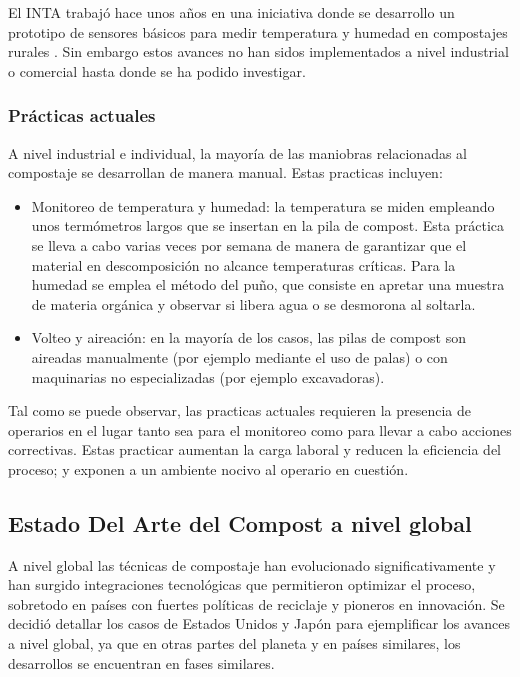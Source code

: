 El INTA trabajó hace unos años en una iniciativa donde se desarrollo un prototipo de sensores básicos para medir temperatura y humedad en compostajes rurales \citep{INTASensorCompost}. Sin embargo estos avances no han sidos implementados a nivel industrial o comercial hasta donde se ha podido investigar.

\subsubsection{Prácticas actuales}
A nivel industrial e individual, la mayoría de las maniobras relacionadas al compostaje se desarrollan de manera manual. Estas practicas incluyen:
\begin{itemize}
    \item Monitoreo de temperatura y humedad: la temperatura se miden empleando unos termómetros largos que se insertan en la pila de compost. Esta práctica se lleva a cabo varias veces por semana de manera de garantizar que el material en descomposición no alcance temperaturas críticas. Para la humedad se emplea el método del puño, que consiste en apretar una muestra de materia orgánica y observar si libera agua o se desmorona al soltarla.
    \item Volteo y aireación: en la mayoría de los casos, las pilas de compost son aireadas manualmente (por ejemplo mediante el uso de palas) o con maquinarias no especializadas (por ejemplo excavadoras).
\end{itemize}

Tal como se puede observar, las practicas actuales requieren la presencia de operarios en el lugar tanto sea para el monitoreo como para llevar a cabo acciones correctivas. Estas practicar aumentan la carga laboral y reducen la eficiencia del proceso; y exponen a un ambiente nocivo al operario en cuestión.

\subsection{Estado Del Arte del Compost a nivel global}
\label{sec:EstadoArteGlobal}

A nivel global las técnicas de compostaje han evolucionado significativamente y han surgido integraciones tecnológicas que permitieron optimizar el proceso, sobretodo en países con fuertes políticas de reciclaje y pioneros en innovación.
Se decidió detallar los casos de Estados Unidos y Japón para ejemplificar los avances a nivel global, ya que en otras partes del planeta y en países similares, los desarrollos se encuentran en fases similares.

